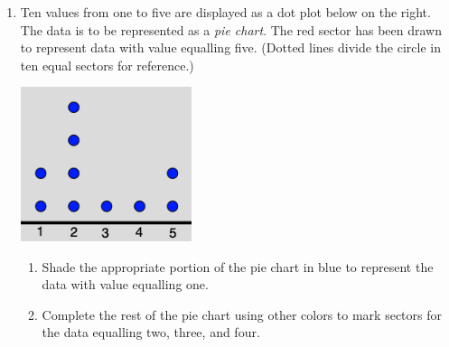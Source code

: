 \documentclass[12pt, twoside]{article}
\begin{document}
\begin{enumerate}
\newpage
\item Ten values from one to five are displayed as a dot plot below on the right. \\[0.5cm]
The data is to be represented as a \emph{pie chart}. The red sector has been drawn to represent data with value equalling five. (Dotted lines divide the circle in ten equal sectors for reference.)
  \begin{multicols}{2}
  \includegraphics[width=5cm]{8-6_8DotPlot.png}
  \end{multicols}
  \begin{enumerate}
    \item Shade the appropriate portion of the pie chart in blue to represent the data with value equalling one.
    \item Complete the rest of the pie chart using other colors to mark sectors for the data equalling two, three, and four.
  \end{enumerate}


\end{enumerate}
\end{document}

